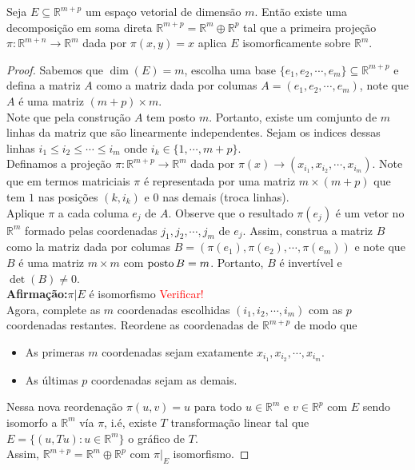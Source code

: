 \begin{lemma}\label{lema:3.11-2teoremadoposto}
  Seja $E\subseteq\mathbb{R}^{m+p}$ um espaço vetorial de dimensão $m$. Então existe uma decomposição em soma direta $\mathbb{R}^{m+p}=\mathbb{R}^{m}\oplus\mathbb{R}^{p}$ tal que a primeira projeção $\pi:\mathbb{R}^{m+n}\to\mathbb{R}^{m}$ dada por $\pi(x,y)=x$ aplica $E$ isomorficamente sobre $\mathbb{R}^{m}$. 
\end{lemma}
\begin{proof} 
  Sabemos que $\dim(E)=m$, escolha uma base $\{e_1,e_2,\cdots,e_m\}\subseteq \mathbb{R}^{m+p}$ e defina a matriz $A$ como a matriz dada por columas $A=(e_1,e_2,\cdots,e_m)$, note que $A$ é uma matriz $(m+p)\times m$.\\
  Note que pela construção $A$ tem posto $m$. Portanto, existe um comjunto de $m$ linhas da matriz que são linearmente independentes. Sejam os indices dessas linhas $i_1\leq i_2\leq \cdots \leq i_m$ onde $i_k\in\{1,\cdots,m+p\}$.\\
  Definamos a projeção $\pi:\mathbb{R}^{m+p}\to\mathbb{R}^{m}$ dada por $\pi(x)\to (x_{i_1},x_{i_2},\cdots,x_{i_m})$. Note que em termos matriciais $\pi$ é representada por uma matriz $m\times (m+p)$ que tem $1$ nas posições $(k,i_k)$ e $0$ nas demais (troca linhas).\\
  Aplique $\pi$ a cada columa $e_j$ de $A$. Observe que o resultado $\pi(e_j)$ é um vetor no $\mathbb{R}^{m}$ formado pelas coordenadas $j_1,j_2,\cdots,j_m$ de $e_j$. Assim, construa a matriz $B$ como la matriz dada por columas $B=\left( \pi(e_1),\pi(e_2),\cdots,\pi(e_m) \right)$ e note que $B$ é uma matriz $m\times m$ com $\operatorname{posto} B=m$. Portanto, $B$ é invertível e $\det(B)\neq 0$.\\
  \textbf{Afirmação:}$\pi\big|{E}$ é isomorfismo \textcolor{red}{Verificar!}\\
  Agora, complete as $m$ coordenadas escolhidas $(i_1,i_2,\cdots,i_m)$ com as $p$ coordenadas restantes. Reordene as coordenadas de $\mathbb{R}^{m+p}$ de modo que
  \begin{itemize}
    \item As primeras $m$ coordenadas sejam exatamente $x_{i_1},x_{i_2},\cdots,x_{i_m}$.
    \item As últimas $p$ coordenadas sejam as demais. 
  \end{itemize}
  Nessa nova reordenação $\pi(u,v)=u$ para todo $u\in\mathbb{R}^{m}$ e $v\in\mathbb{R}^{p}$ com $E$ sendo isomorfo a $\mathbb{R}^{m}$ vía $\pi$, i.é, existe $T$ transformação linear tal que $E=\{(u,Tu):u\in\mathbb{R}^{m}\}$ o gráfico de $T$.\\
  Assim, $\mathbb{R}^{m+p}=\mathbb{R}^{m}\oplus\mathbb{R}^{p}$ com $\pi\big|_{E}$ isomorfismo. 
\end{proof}
